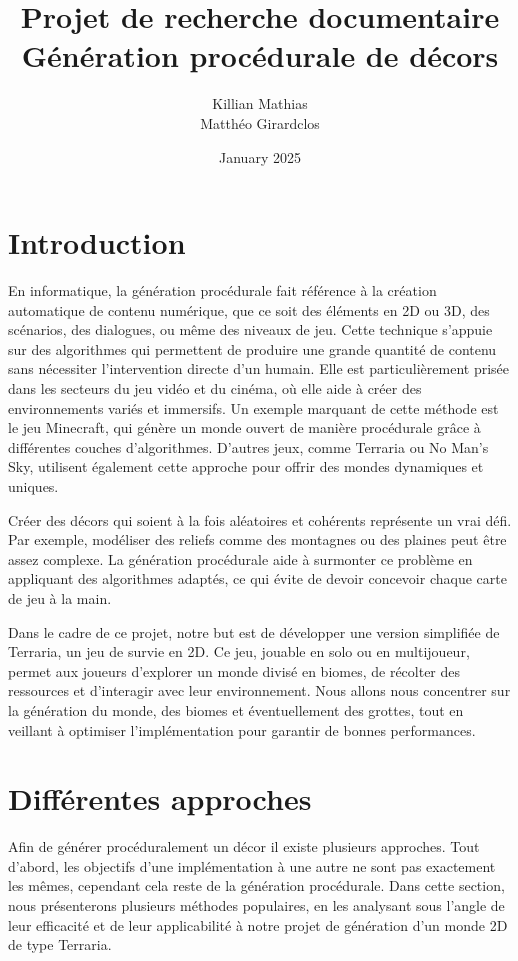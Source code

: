 \documentclass{article}
\title{Projet de recherche documentaire\\ \large Génération procédurale de décors}
\author{Killian Mathias\\ Matthéo Girardclos}
\date{January 2025}
\begin{document}
\maketitle
\tableofcontents
\newpage
\section{Introduction}

En informatique, la génération procédurale fait référence à la création automatique de contenu numérique, que ce soit des éléments en 2D ou 3D, des scénarios, des dialogues, ou même des niveaux de jeu. Cette technique s'appuie sur des algorithmes qui permettent de produire une grande quantité de contenu sans nécessiter l'intervention directe d'un humain. Elle est particulièrement prisée dans les secteurs du jeu vidéo et du cinéma, où elle aide à créer des environnements variés et immersifs.  Un exemple marquant de cette méthode est le jeu Minecraft, qui génère un monde ouvert de manière procédurale grâce à différentes couches d'algorithmes. D'autres jeux, comme Terraria ou No Man’s Sky, utilisent également cette approche pour offrir des mondes dynamiques et uniques.\par
Créer des décors qui soient à la fois aléatoires et cohérents représente un vrai défi. Par exemple, modéliser des reliefs comme des montagnes ou des plaines peut être assez complexe. La génération procédurale aide à surmonter ce problème en appliquant des algorithmes adaptés, ce qui évite de devoir concevoir chaque carte de jeu à la main.\par
  Dans le cadre de ce projet, notre but est de développer une version simplifiée de Terraria, un jeu de survie en 2D. Ce jeu, jouable en solo ou en multijoueur, permet aux joueurs d'explorer un monde divisé en biomes, de récolter des ressources et d'interagir avec leur environnement. Nous allons nous concentrer sur la génération du monde, des biomes et éventuellement des grottes, tout en veillant à optimiser l'implémentation pour garantir de bonnes performances.


\section{Différentes approches}

Afin de générer procéduralement un décor il existe plusieurs approches. Tout d'abord, les objectifs d'une implémentation à une autre ne sont pas exactement les mêmes, cependant cela reste de la génération procédurale. Dans cette section, nous présenterons plusieurs méthodes populaires, en les analysant sous l’angle de leur efficacité et de leur applicabilité à notre projet de génération d’un monde 2D de type Terraria.\par
\end{document}
